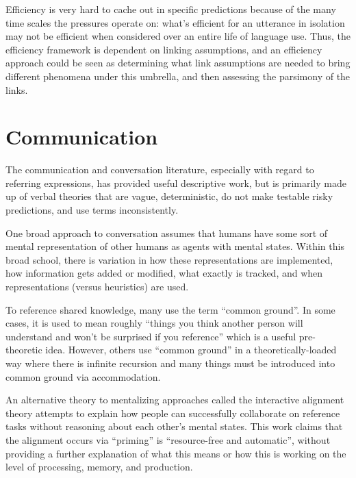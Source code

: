 \documentclass[]{article}
\begin{document}
Efficiency is very hard to cache out in specific predictions because of the many time scales the pressures operate on: what's efficient for an utterance in isolation may not be efficient when considered over an entire life of language use. Thus, the efficiency framework is dependent on linking assumptions, and an efficiency approach could be seen as determining what link assumptions are needed to bring different phenomena under this umbrella, and then assessing the parsimony of the links.


\section{Communication}
The communication and conversation literature, especially with regard to referring expressions, has provided useful descriptive work, but is primarily made up of verbal theories that are vague, deterministic, do not make testable risky predictions, and use terms inconsistently. %

One broad approach to conversation assumes that humans have some sort of mental representation of other humans as agents with mental states. Within this broad school, there is variation in how these representations are implemented, how information gets added or modified, what exactly is tracked, and when representations (versus heuristics) are used. 

To reference shared knowledge, many use the term ``common ground''. In some cases, it is used to mean roughly ``things you think another person will understand and won't be surprised if you reference'' which is a useful pre-theoretic idea. However, others use ``common ground'' in a theoretically-loaded way where there is infinite recursion and many things must be introduced into common ground via accommodation. 

An alternative theory to mentalizing approaches called the interactive alignment theory attempts to explain how people can successfully collaborate on reference tasks without reasoning about each other's mental states. This work claims that the alignment occurs via ``priming'' is ``resource-free and automatic'', without providing a further explanation of what this means or how this is working on the level of processing, memory, and production. 
\end{document}
